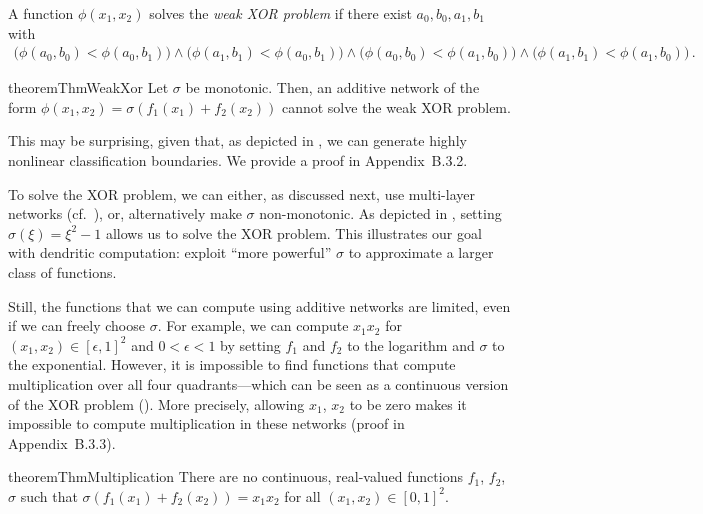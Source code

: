 \begin{definition}
\label{def:weak_xor}
A function $\phi(x_1, x_2)$ solves the \emph{weak XOR problem} if there exist $a_0, b_0, a_1, b_1$ with
\begin{align*}
	\big( \phi(a_0, b_0) < \phi(a_0, b_1) \big) \wedge
	\big( \phi(a_1, b_1) < \phi(a_0, b_1) \big) \wedge
	\big( \phi(a_0, b_0) < \phi(a_1, b_0) \big) \wedge
	\big( \phi(a_1, b_1) < \phi(a_1, b_0) \big) \,.
\end{align*}
\end{definition}


\begin{restatable}{theorem}{ThmWeakXor}
\label{thm:weak_xor}
Let $\sigma$ be monotonic. Then, an additive network of the form $\phi(x_1, x_2) = \sigma(f_1(x_1) + f_2(x_2))$ cannot solve the weak XOR problem.
\end{restatable}
This may be surprising, given that, as depicted in , we can generate highly nonlinear classification boundaries.
We provide a proof in Appendix~B.3.2.

To solve the XOR problem, we can either, as discussed next, use multi-layer networks (cf.~), or, alternatively make $\sigma$ non-monotonic.
As depicted in , setting $\sigma(\xi) = \xi^2 - 1$ allows us to solve the XOR problem.
This illustrates our goal with dendritic computation: exploit \enquote{more powerful} $\sigma$ to approximate a larger class of functions.

Still, the functions that we can compute using additive networks are limited, even if we can freely choose $\sigma$.
For example, we can compute $x_1 x_2$ for $(x_1, x_2) \in [\epsilon, 1]^2$ and $0 < \epsilon < 1$ by setting $f_1$ and $f_2$ to the logarithm and $\sigma$ to the exponential.
However, it is impossible to find functions that compute multiplication over all four quadrants---which can be seen as a continuous version of the XOR problem ().
More precisely, allowing $x_1$, $x_2$ to be zero makes it impossible to compute multiplication in these networks (proof in Appendix~B.3.3).
\begin{restatable}{theorem}{ThmMultiplication}
\label{thm:multiplication}
There are no continuous, real-valued functions $f_1$, $f_2$, $\sigma$ such that $\sigma(f_1(x_1) + f_2(x_2)) = x_1 x_2$ for all $(x_1, x_2) \in [0, 1]^2$.
\end{restatable}


